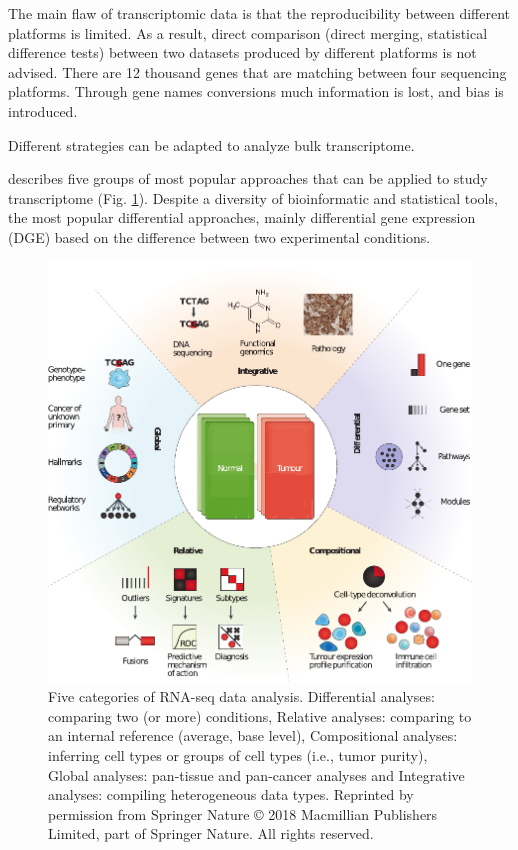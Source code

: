 \documentclass[12pt,]{book}
\theoremstyle{definition}
\theoremstyle{definition}
\theoremstyle{definition}
\theoremstyle{remark}
\begin{document}
The main flaw of transcriptomic data is that the reproducibility between
different platforms is limited. As a result, direct comparison (direct
merging, statistical difference tests) between two datasets produced by
different platforms is not advised. There are 12 thousand genes that are
matching between four sequencing platforms. Through gene names
conversions much information is lost, and bias is introduced.

Different strategies can be adapted to analyze bulk transcriptome.

\citet{Cieslik2017} describes five groups of most popular approaches
that can be applied to study transcriptome (Fig.
\ref{fig:transcriptome-methods}). Despite a diversity of bioinformatic
and statistical tools, the most popular differential approaches, mainly
differential gene expression (DGE) based on the difference between two
experimental conditions.

\begin{figure}

{\centering \includegraphics[width=1\linewidth]{figures-ext/transcriptome-methods} 

}

\caption[Five categories of RNA-seq data analysis.]{Five categories of RNA-seq data
analysis. Differential analyses: comparing two (or more) conditions,
Relative analyses: comparing to an internal reference (average, base
level), Compositional analyses: inferring cell types or groups of cell
types (i.e., tumor purity), Global analyses: pan-tissue and pan-cancer
analyses and Integrative analyses: compiling heterogeneous data types.
Reprinted by permission from Springer Nature \citep{Cieslik2017} © 2018
Macmillian Publishers Limited, part of Springer Nature. All rights
reserved.}\label{fig:transcriptome-methods}
\end{figure}
\end{document}
